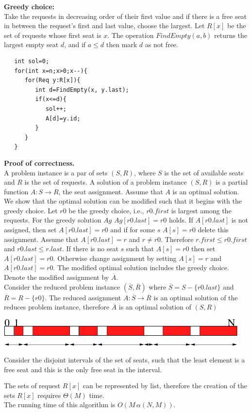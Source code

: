 \noindent\textbf{Greedy choice:}\\
Take the requests in decreasing order of their first value and if there is a free seat in between the request's first and last value, choose the largest. Let $R[x]$ be the set of requests whose first seat is $x$. The operation $FindEmpty(a,b)$ returns the largest empty seat $d$, and if $a \leq d$ then mark $d$ as not free.
\begin{lstlisting}
   int sol=0;
   for(int x=n;x>0;x--){
      for(Req y:R[x]){
         int d=FindEmpty(x, y.last);
         if(x<=d){
            sol++;
            A[d]=y.id;
         }
      }
   }
\end{lstlisting}
\textbf{Proof of correctness.}\\
A problem instance is a par of sets $(S, R)$, where $S$ is the set of available seats and $R$ is the set of requests. A solution of a problem instance  $(S, R)$ is a partial function $A: S \rightarrow R$, the seat assignment. Assume that $A$ is an optimal solution. We show that the optimal solution can be modified such that it begins with the greedy choice. Let $r0$ be the greedy choice, i.e., $r0.first$ is largest among the requests. For the greedy solution $Ag$ $Ag[r0.last]=r0$ holds. If $A[r0.last]$ is not assigned, then set $A[r0.last]=r0$ and if for some $s$ $A[s]=r0$ delete this assignment. Assume that $A[r0.last]=r$ and $r \neq r0$. Therefore $r.first \leq r0.first$ and $r0.last \leq r.last$. If there is no seat $s$ such that $A[s]=r0$ then set $A[r0.last]=r0$. Otherwise change assignment by setting $A[s]=r$ and $A[r0.last]=r0$. The modified optimal solution includes the greedy choice. Denote the modified assignment by  $\overline{A}$.\\
Consider the reduced problem instance $(\overline{S}, \overline{R})$ where $\overline{S}=S-\{r0.last\}$ and $\overline{R}=R-\{r0\}$. The reduced assignment $A: \overline{S} \rightarrow \overline{R}$ is an optimal solution of the reduces problem instance, therefore $\overline{A}$ is an optimal solution of $(S,R)$
\begin{center}
\includegraphics[height=1.5cm]{img/abra51.pdf}
\end{center}
Consider the disjoint intervals of the set of seats, such that the least element is a free seat and this is the only free seat in the interval.

The sets of request $R[x]$ can be represented by list, therefore the creation of the sets $R[x]$ requires $\Theta(M)$ time.\\
The running time of this algorithm is $O(M \, \alpha(N,M))$.
